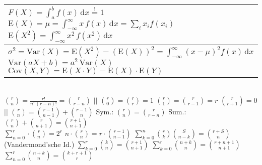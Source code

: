 \documentclass[a4paper,10pt,titlepage]{scrartcl}
\begin{document}
\noindent\begin{tabular}{l}
$F(X)=\int_{a}^{b}f(x)\,\mathrm{d}x\stackrel{!}=1$
\quad $\mathrm{E}(X)=\mu=\int_{-\infty}^{\infty}x\,f(x)\,\mathrm{d}x=\sum\limits_{i}x_i f(x_i)$
\quad $\mathrm{E}(X^2)=\int_{-\infty}^{\infty}x^2\,f(x^2)\,\mathrm{d}x$
\\ \hline
$\sigma^2=\mathrm{Var}(X)=\mathrm{E}(X^2)-(\mathrm{E}(X))^2=\int_{-\infty}^{\infty}(x-\mu)^2f(x)\,\mathrm{d}x$
\quad $\mathrm{Var}(aX+b)=a^2\,\mathrm{Var}(X)$
\quad $\mathrm{Cov}(X,Y)=\mathrm{E}(X\cdot Y)-\mathrm{E}(X)\cdot \mathrm{E}(Y)$
\\
\end{tabular}

 \smallskip \\
{\fontsize{9pt}{0pt}\selectfont
 $\binom{r}{n}=\frac{r!}{n!\,(r-n)!}=\binom{r}{r-n}$ \;$|\!|$\;
 $\binom{r}{0}=\binom{r}{r}=1$ \quad
 $\binom{r}{1}=\binom{r}{r-1}=r$ \; $\binom{r}{r+1}=0$ \;$|\!|$\; $\binom{r}{n}=\binom{r-1}{n-1}+\binom{r-1}{n}$ \quad
 Sym.: $\binom{r}{n}=\binom{r}{r-n}$ \quad Sum.: $\binom{r}{n}+\binom{r}{n+1}=\binom{r+1}{n+1}$
}
\smallskip\\
{\fontsize{9pt}{0pt}\selectfont
 $\sum\limits_{n=0}^{r}\cdot\binom{r}{n}=2^r$ \quad $n\cdot \binom{r}{n}=r\cdot \binom{r-1}{n-1}$
 \quad $\sum\limits_{k=0}^{n}\binom{r}{k}\binom{S}{n-k}=\binom{r+S}{n}$ {\fontsize{8pt}{0pt}\selectfont (Vandermond'sche Id.)}\quad
 $\sum\limits_{k=0}^{r}\binom{k}{n}=\binom{r+1}{n+1}$ \quad $\sum\limits_{k=0}^{r}\binom{n+k}{n}=\binom{r+n+1}{n+1}$ \quad $\sum\limits_{n=0}^{r}\binom{n+k}{n}=\binom{k+r+1}{r}$
}
\end{document}
